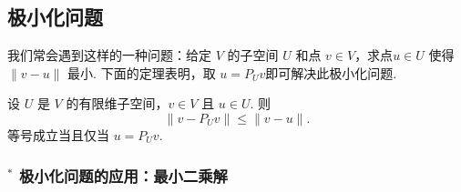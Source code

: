 \subsection{极小化问题}

我们常会遇到这样的一种问题：给定 $ V $ 的子空间 $ U $ 和点 $ v \in V $，求点$ u \in U $ 使得 $ \lVert v - u \rVert $ 最小. 下面的定理表明，取 $ u = P_U v$即可解决此极小化问题.

\begin{theorem}{}{}
    设 $ U $ 是 $ V $ 的有限维子空间，$ v \in V $ 且 $ u \in U $. 则
    \[\lVert v - P_U v \rVert \leqslant \lVert v - u \rVert. \]
    等号成立当且仅当 $ u = P_U v $.
\end{theorem}

\subsubsection*{$^*$ 极小化问题的应用：最小二乘解}

